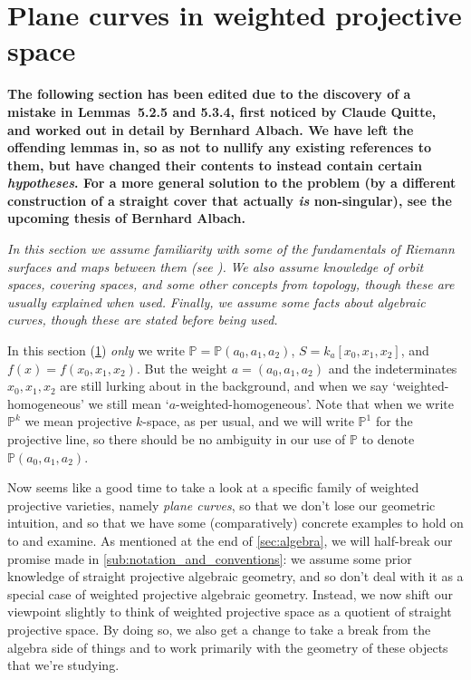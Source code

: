 \documentclass[10pt,notitlepage]{article}
\numberwithin{equation}{subsection}
\newcommand{\pee}{\mathbb{P}}
\newcommand{\kathree}{k_a[x_0,x_1,x_2]}
\newcommand{\pathree}{\pee(a_0,a_1,a_2)}
\newcommand{\poly}{S}
\begin{document}





\section{Plane curves in weighted projective space} %
\label{sec:curves_in_weighted_projective_space}

    {\color{purple}\textbf{The following section has been edited due to the discovery of a mistake in Lemmas~5.2.5 and 5.3.4, first noticed by Claude Quitte, and worked out in detail by Bernhard Albach. We have left the offending lemmas in, so as not to nullify any existing references to them, but have changed their contents to instead contain certain \emph{hypotheses}. For a more general solution to the problem (by a different construction of a straight cover that actually \emph{is} non-singular), see the upcoming thesis of Bernhard Albach.}}

    \bigskip


    \emph{In this section we assume familiarity with some of the fundamentals of Riemann surfaces and maps between them (see \cite[Chapters~1,~2]{Miranda:1995uz}).}
    \emph{We also assume knowledge of orbit spaces, covering spaces, and some other concepts from topology, though these are usually explained when used.}
    \emph{Finally, we assume some facts about algebraic curves, though these are stated before being used.}

    \bigskip

    \begin{note}
        In this section (\cref{sec:curves_in_weighted_projective_space}) \emph{only} we write $\pee=\pathree$, $\poly=\kathree$, and $f(x)=f(x_0,x_1,x_2)$.
        But the weight \mbox{$a=(a_0,a_1,a_2)$} and the indeterminates $x_0,x_1,x_2$ are still lurking about in the background, and when we say `weighted-homogeneous' we still mean `$a$-weighted-homogeneous'.
        Note that when we write $\pee^k$ we mean projective $k$-space, as per usual, and we will write $\pee^1$ for the projective line, so there should be no ambiguity in our use of $\pee$ to denote $\pee(a_0,a_1,a_2)$.
    \end{note}
    Now seems like a good time to take a look at a specific family of weighted projective varieties, namely \emph{plane curves}, so that we don't lose our geometric intuition, and so that we have some (comparatively) concrete examples to hold on to and examine.
    As mentioned at the end of \cref{sec:algebra}, we will half-break our promise made in \cref{sub:notation_and_conventions}: we assume some prior knowledge of straight projective algebraic geometry, and so don't deal with it as a special case of weighted projective algebraic geometry.
    Instead, we now shift our viewpoint slightly to think of weighted projective space as a quotient of straight projective space.
    By doing so, we also get a change to take a break from the algebra side of things and to work primarily with the geometry of these objects that we're studying.
\end{document}
